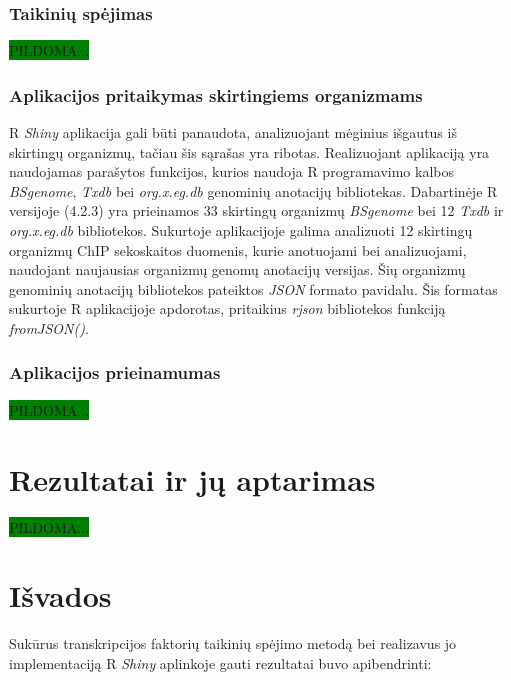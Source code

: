 \documentclass[12pt]{article}
\begin{document}
\subsubsection*{Taikinių spėjimas}
\colorbox{green}{PILDOMA...}

\subsubsection*{Aplikacijos pritaikymas skirtingiems organizmams}
R \emph{Shiny} aplikacija gali būti panaudota, analizuojant mėginius išgautus
iš skirtingų organizmų, tačiau šis sąrašas yra ribotas. Realizuojant aplikaciją
yra naudojamas parašytos funkcijos, kurios naudoja R programavimo kalbos
\emph{BSgenome}, \emph{Txdb} bei \emph{org.x.eg.db} genominių anotacijų
bibliotekas. Dabartinėje R versijoje (4.2.3) yra prieinamos 33 skirtingų
organizmų \emph{BSgenome} bei 12 \emph{Txdb} ir \emph{org.x.eg.db} bibliotekos.
Sukurtoje aplikacijoje galima analizuoti 12 skirtingų organizmų ChIP sekoskaitos
duomenis, kurie anotuojami bei analizuojami, naudojant naujausias organizmų
genomų anotacijų versijas. Šių organizmų genominių anotacijų bibliotekos
pateiktos \emph{JSON}\cite{JSON} formato pavidalu. Šis formatas sukurtoje
R aplikacijoje apdorotas, pritaikius \emph{rjson}\cite{RJSON} bibliotekos
funkciją \emph{fromJSON()}.

\subsubsection*{Aplikacijos prieinamumas}
\colorbox{green}{PILDOMA...}

\newpage


\section{Rezultatai ir jų aptarimas}
\colorbox{green}{PILDOMA...}

\newpage


\section{Išvados}
Sukūrus transkripcijos faktorių taikinių spėjimo metodą bei realizavus jo
implementaciją R \emph{Shiny} aplinkoje gauti rezultatai buvo apibendrinti:
\end{document}
